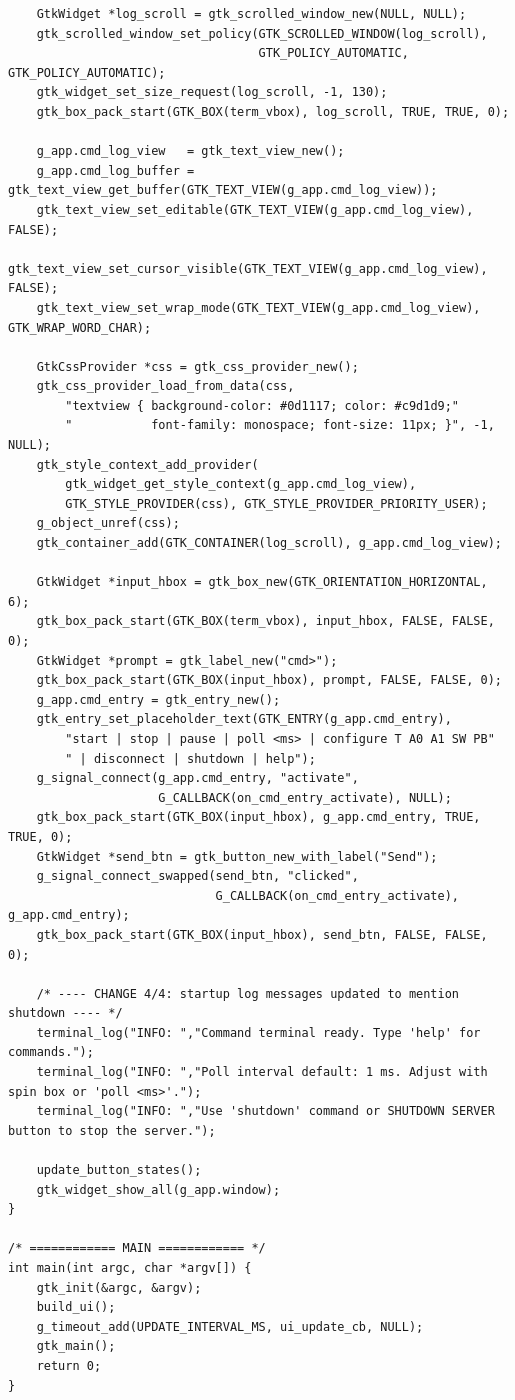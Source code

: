 \begin{verbatim}
    GtkWidget *log_scroll = gtk_scrolled_window_new(NULL, NULL);
    gtk_scrolled_window_set_policy(GTK_SCROLLED_WINDOW(log_scroll),
                                   GTK_POLICY_AUTOMATIC, GTK_POLICY_AUTOMATIC);
    gtk_widget_set_size_request(log_scroll, -1, 130);
    gtk_box_pack_start(GTK_BOX(term_vbox), log_scroll, TRUE, TRUE, 0);

    g_app.cmd_log_view   = gtk_text_view_new();
    g_app.cmd_log_buffer = gtk_text_view_get_buffer(GTK_TEXT_VIEW(g_app.cmd_log_view));
    gtk_text_view_set_editable(GTK_TEXT_VIEW(g_app.cmd_log_view), FALSE);
    gtk_text_view_set_cursor_visible(GTK_TEXT_VIEW(g_app.cmd_log_view), FALSE);
    gtk_text_view_set_wrap_mode(GTK_TEXT_VIEW(g_app.cmd_log_view), GTK_WRAP_WORD_CHAR);

    GtkCssProvider *css = gtk_css_provider_new();
    gtk_css_provider_load_from_data(css,
        "textview { background-color: #0d1117; color: #c9d1d9;"
        "           font-family: monospace; font-size: 11px; }", -1, NULL);
    gtk_style_context_add_provider(
        gtk_widget_get_style_context(g_app.cmd_log_view),
        GTK_STYLE_PROVIDER(css), GTK_STYLE_PROVIDER_PRIORITY_USER);
    g_object_unref(css);
    gtk_container_add(GTK_CONTAINER(log_scroll), g_app.cmd_log_view);

    GtkWidget *input_hbox = gtk_box_new(GTK_ORIENTATION_HORIZONTAL, 6);
    gtk_box_pack_start(GTK_BOX(term_vbox), input_hbox, FALSE, FALSE, 0);
    GtkWidget *prompt = gtk_label_new("cmd>");
    gtk_box_pack_start(GTK_BOX(input_hbox), prompt, FALSE, FALSE, 0);
    g_app.cmd_entry = gtk_entry_new();
    gtk_entry_set_placeholder_text(GTK_ENTRY(g_app.cmd_entry),
        "start | stop | pause | poll <ms> | configure T A0 A1 SW PB"
        " | disconnect | shutdown | help");
    g_signal_connect(g_app.cmd_entry, "activate",
                     G_CALLBACK(on_cmd_entry_activate), NULL);
    gtk_box_pack_start(GTK_BOX(input_hbox), g_app.cmd_entry, TRUE, TRUE, 0);
    GtkWidget *send_btn = gtk_button_new_with_label("Send");
    g_signal_connect_swapped(send_btn, "clicked",
                             G_CALLBACK(on_cmd_entry_activate), g_app.cmd_entry);
    gtk_box_pack_start(GTK_BOX(input_hbox), send_btn, FALSE, FALSE, 0);

    /* ---- CHANGE 4/4: startup log messages updated to mention shutdown ---- */
    terminal_log("INFO: ","Command terminal ready. Type 'help' for commands.");
    terminal_log("INFO: ","Poll interval default: 1 ms. Adjust with spin box or 'poll <ms>'.");
    terminal_log("INFO: ","Use 'shutdown' command or SHUTDOWN SERVER button to stop the server.");

    update_button_states();
    gtk_widget_show_all(g_app.window);
}

/* ============ MAIN ============ */
int main(int argc, char *argv[]) {
    gtk_init(&argc, &argv);
    build_ui();
    g_timeout_add(UPDATE_INTERVAL_MS, ui_update_cb, NULL);
    gtk_main();
    return 0;
}


\end{verbatim}